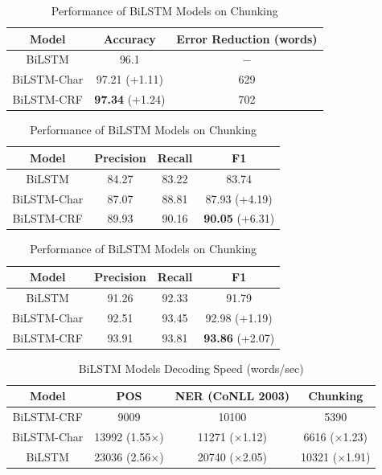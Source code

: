\begin{table}[h]
\centering
\caption{Performance of BiLSTM Models on POS}
\label{table:lstm-table1}
\begin{tabular}{|c|c|c|}
\hline
Model         & Accuracy  & Error Reduction (words)      \\ \hline
BiLSTM  & 96.1     & $-$                            \\ \hline
BiLSTM-Char & 97.21 (+1.11) & 629             \\ \hline
BiLSTM-CRF & \textbf{97.34} (+1.24)  & 702             \\ \hline
\end{tabular}
\bigskip
\caption{Performance of BiLSTM Models on NER CoNLL 2003 Data}
\label{table:lstm-table2}
\begin{tabular}{|c|c|c|c|}
\hline
Model  & Precision & Recall & F1      \\ \hline
BiLSTM  & 84.27 & 83.22 & 83.74     \\ \hline
BiLSTM-Char & 87.07 & 88.81 & 87.93 (+4.19)\\ \hline
BiLSTM-CRF & 89.93 & 90.16 & \textbf{90.05} (+6.31)  \\ \hline
\end{tabular}
\bigskip
\caption{Performance of BiLSTM Models on Chunking}
\label{table:lstm-table3}
\begin{tabular}{|c|c|c|c|}
\hline
Model  & Precision & Recall & F1      \\ \hline
BiLSTM  & 91.26 & 92.33 & 91.79    \\ \hline
BiLSTM-Char & 92.51 & 93.45 & 92.98 (+1.19)\\ \hline
BiLSTM-CRF & 93.91 & 93.81 & \textbf{93.86} (+2.07)  \\ \hline
\end{tabular}
\end{table}


\begin{table}[h]
\centering
\caption{BiLSTM Models Decoding Speed (words/sec)}
\label{table:lstm-table4}
\begin{tabular}{|c|c|c|c|}
\hline
Model       & POS & NER (CoNLL 2003) & Chunking    \\ \hline
BiLSTM-CRF    & 9009     & 10100   &5390\\ \hline
BiLSTM-Char        & 13992 (1.55$\times$)    & 11271 ($\times$1.12) &6616 ($\times$1.23) \\ \hline
BiLSTM             & 23036 (2.56$\times$)   & 20740 ($\times$2.05)  &10321 ($\times$1.91)\\ \hline
\end{tabular}
\end{table}

